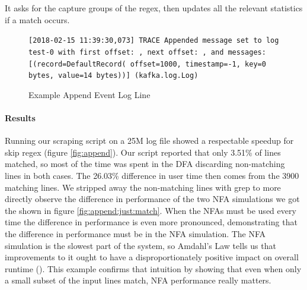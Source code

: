 It asks for the capture groups of the regex,
then updates all the relevant statistics if a match occurs.

\begin{figure}
\caption{Example Append Event Log Line}
\label{fig:appendevent}

\texttt{[2018-02-15 11:39:30,073] \allowbreak TRACE Appended \allowbreak
message set \allowbreak to log \allowbreak test-0 with \allowbreak
first offset: , next offset: , and
messages: [(record=\allowbreak DefaultRecord(\allowbreak
offset=1000, \allowbreak timestamp=-1, \allowbreak key=0 bytes,
 value=14 \allowbreak bytes))] \allowbreak(kafka.log.Log)
}
\end{figure}

\paragraph{Results}

Running our scraping script on a 25M log file showed a
respectable speedup for skip regex (figure \ref{fig:append}).
Our script reported that only 3.51\% of lines matched, so
most of the time was spent in the DFA discarding non-matching
lines in both cases. The 26.03\% difference in user
time then comes from the 3900 matching lines. We stripped
away the non-matching lines with grep to more directly observe
the difference in performance of the two NFA simulations we got
the shown in figure \ref{fig:append:just:match}.
When the NFAs must be used every time the difference in performance
is even more pronounced, demonstrating that the difference in performance
must be in the NFA simulation. The NFA simulation is the slowest part of
the system, so Amdahl's Law tells us that improvements to it ought to have
a disproportionately positive impact on overall runtime (\cite{Amdahl1967}).
This example confirms that intuition by showing that even when only a small
subset of the input lines match, NFA performance really matters.

